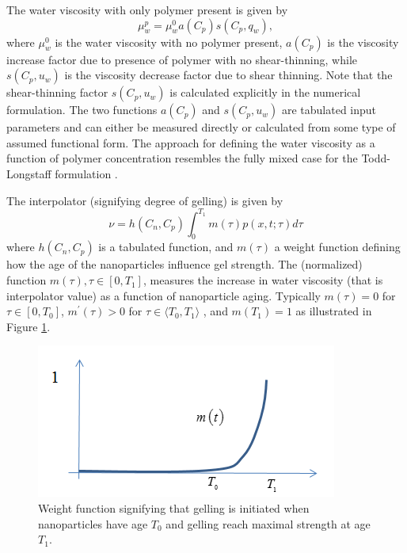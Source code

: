 \documentclass[nanomaterials,article,submit,moreauthors,pdftex]{Definitions/mdpi}
\begin{document}
The water viscosity with only polymer present is given by
\begin{equation}
    \mu_w^p=\mu_w^0 a(C_p) s(C_p, q_w),
\end{equation}
where $\mu_w^0$ is the water viscosity with no polymer present, $a (C_p)$ is the viscosity increase factor due to presence of polymer with no shear-thinning, while $s(C_p, u_w)$ is the viscosity decrease factor due to shear thinning. Note that the shear-thinning factor $s(C_p, u_w)$ is calculated explicitly in the numerical formulation. The two functions $a (C_p)$ and $s(C_p, u_w)$ are tabulated input parameters and can either be measured directly or calculated from some type of assumed functional form. The approach for defining the water viscosity as a function of polymer concentration resembles the fully mixed case for the Todd-Longstaff formulation \citep{slb2015}.   

The interpolator (signifying degree of gelling) is given by
\begin{equation} \label{eq:ageEffect} %
    \nu=h(C_n,C_p) \int^{T_1}_{0}m(\tau)p(x,t;\tau)d\tau
\end{equation}
where $h(C_n,C_p)$ is a tabulated function, and $m(\tau)$ a weight function defining how the age of the nanoparticles influence gel strength. The (normalized) function $m(\tau), \tau\in[0,T_1]$, measures the increase in water viscosity (that is interpolator value) as a function of nanoparticle aging. Typically $m(\tau)=0$ for $\tau\in[0,T_0]$,  $m^\prime(\tau)>0$ for $\tau\in\langle T_0, T_1\rangle$ , and $m(T_1)=1$ as illustrated in Figure \ref{fig:weightFunc}.

\begin{figure}[h]
    \centering
    \includegraphics[width=.5\textwidth]{fig/weightFunc.png}
    \caption{Weight function signifying that gelling is initiated when nanoparticles have age $T_0$ and gelling reach maximal strength at age $T_1$.}
    \label{fig:weightFunc}
\end{figure}
\end{document}

